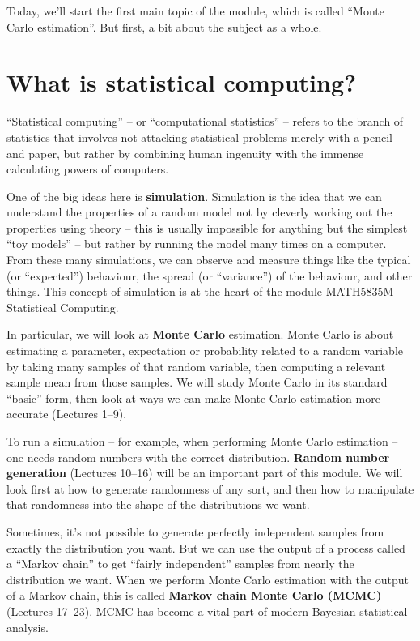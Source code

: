 \documentclass[
  letterpaper,
  DIV=11,
  numbers=noendperiod]{scrreprt}
\theoremstyle{plain}
\theoremstyle{definition}
\theoremstyle{definition}
\theoremstyle{remark}
\begin{document}
\[ \]

Today, we'll start the first main topic of the module, which is called
``Monte Carlo estimation''. But first, a bit about the subject as a
whole.

\section{What is statistical
computing?}\label{what-is-statistical-computing}

``Statistical computing'' -- or ``computational statistics'' -- refers
to the branch of statistics that involves not attacking statistical
problems merely with a pencil and paper, but rather by combining human
ingenuity with the immense calculating powers of computers.

One of the big ideas here is \textbf{simulation}. Simulation is the idea
that we can understand the properties of a random model not by cleverly
working out the properties using theory -- this is usually impossible
for anything but the simplest ``toy models'' -- but rather by running
the model many times on a computer. From these many simulations, we can
observe and measure things like the typical (or ``expected'') behaviour,
the spread (or ``variance'') of the behaviour, and other things. This
concept of simulation is at the heart of the module MATH5835M
Statistical Computing.

In particular, we will look at \textbf{Monte Carlo} estimation. Monte
Carlo is about estimating a parameter, expectation or probability
related to a random variable by taking many samples of that random
variable, then computing a relevant sample mean from those samples. We
will study Monte Carlo in its standard ``basic'' form, then look at ways
we can make Monte Carlo estimation more accurate (Lectures 1--9).

To run a simulation -- for example, when performing Monte Carlo
estimation -- one needs random numbers with the correct distribution.
\textbf{Random number generation} (Lectures 10--16) will be an important
part of this module. We will look first at how to generate randomness of
any sort, and then how to manipulate that randomness into the shape of
the distributions we want.

Sometimes, it's not possible to generate perfectly independent samples
from exactly the distribution you want. But we can use the output of a
process called a ``Markov chain'' to get ``fairly independent'' samples
from nearly the distribution we want. When we perform Monte Carlo
estimation with the output of a Markov chain, this is called
\textbf{Markov chain Monte Carlo (MCMC)} (Lectures 17--23). MCMC has
become a vital part of modern Bayesian statistical analysis.
\end{document}
